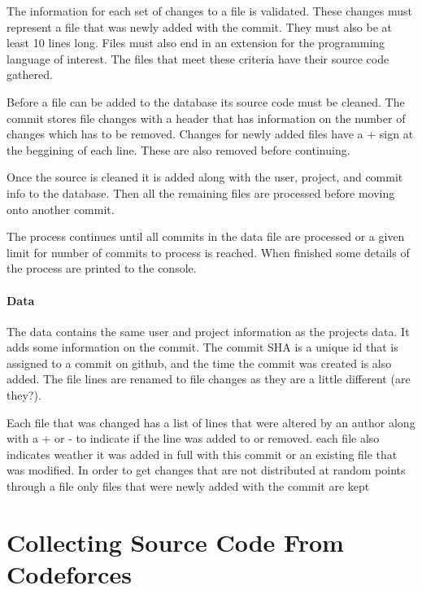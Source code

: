 \documentclass{article}
\begin{document}
The information for each set of changes to a file is validated. These changes must represent a file that was newly added with the commit. They must also be at least 10 lines long. Files must also end in an extension for the programming language of interest. The files that meet these criteria have their source code gathered.

Before a file can be added to the database its source code must be cleaned. The commit stores file changes with a header that has information on the number of changes which has to be removed. Changes for newly added files have a + sign at the beggining of each line. These are also removed before continuing.

Once the source is cleaned it is added along with the user, project, and commit info to the database. Then all the remaining files are processed before moving onto another commit.

The process continues until all commits in the data file are processed or a given limit for number of commits to process is reached. When finished some details of the process are printed to the console.

\paragraph{Data}
The data contains the same user and project information as the projects data. It adds some information on the commit. The commit SHA is a unique id that is assigned to a commit on github, and the time the commit was created is also added. The file lines are renamed to file changes as they are a little different (are they?).

Each file that was changed has a list of lines that were altered by an author along with a + or - to indicate if the line was added to or removed. each file also indicates weather it was added in full with this commit or an existing file that was modified. In order to get changes that are not distributed at random points through a file only files that were newly added with the commit are kept


\section{Collecting Source Code From Codeforces}


\end{document}
